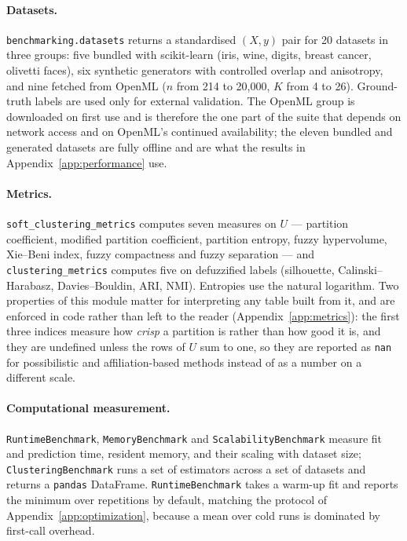 \documentclass[twoside,11pt]{article}
\begin{document}
\paragraph{Datasets.} \texttt{benchmarking.datasets} returns a standardised
$(X, y)$ pair for 20 datasets in three groups: five bundled with
scikit-learn (iris, wine, digits, breast cancer, olivetti faces), six
synthetic generators with controlled overlap and anisotropy, and nine fetched
from OpenML ($n$ from 214 to 20{,}000, $K$ from 4 to 26). Ground-truth labels
are used only for external validation. The OpenML group is downloaded on
first use and is therefore the one part of the suite that depends on network
access and on OpenML's continued availability; the eleven bundled and
generated datasets are fully offline and are what the results in
Appendix~\ref{app:performance} use.

\paragraph{Metrics.} \texttt{soft\_clustering\_metrics} computes seven
measures on $U$ --- partition coefficient, modified partition coefficient,
partition entropy, fuzzy hypervolume, Xie--Beni index, fuzzy compactness and
fuzzy separation --- and \texttt{clustering\_metrics} computes five on
defuzzified labels (silhouette, Calinski--Harabasz, Davies--Bouldin, ARI,
NMI). Entropies use the natural logarithm. Two properties of this module
matter for interpreting any table built from it, and are enforced in code
rather than left to the reader (Appendix~\ref{app:metrics}): the first three
indices measure how \emph{crisp} a partition is rather than how good it is,
and they are undefined unless the rows of $U$ sum to one, so they are
reported as \texttt{nan} for possibilistic and affiliation-based methods
instead of as a number on a different scale.

\paragraph{Computational measurement.}
\texttt{RuntimeBenchmark}, \texttt{MemoryBenchmark} and
\texttt{ScalabilityBenchmark} measure fit and prediction time, resident
memory, and their scaling with dataset size; \texttt{ClusteringBenchmark}
runs a set of estimators across a set of datasets and returns a
\texttt{pandas} DataFrame. \texttt{RuntimeBenchmark} takes a warm-up fit and
reports the minimum over repetitions by default, matching the protocol of
Appendix~\ref{app:optimization}, because a mean over cold runs is dominated
by first-call overhead.
\end{document}

